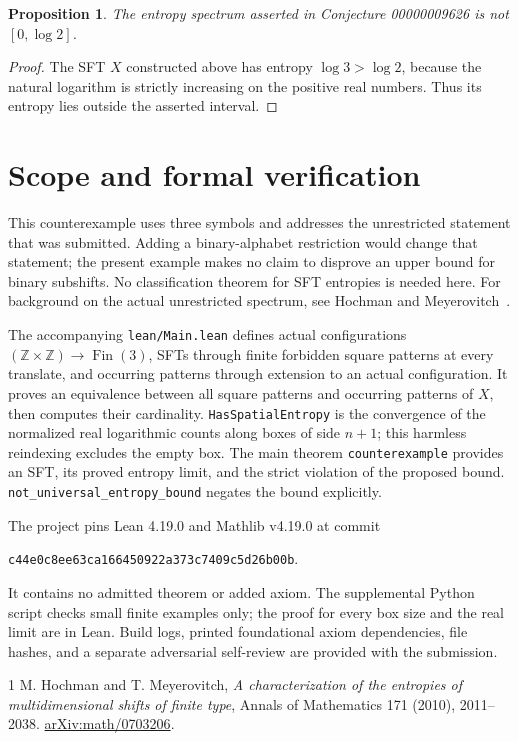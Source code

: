 \documentclass[11pt]{article}
\newtheorem{proposition}{Proposition}
\begin{document}
\begin{proposition}
The entropy spectrum asserted in Conjecture 00000009626 is not $[0,\log 2]$.
\end{proposition}
\begin{proof}
The SFT $X$ constructed above has entropy $\log 3>\log 2$, because the
natural logarithm is strictly increasing on the positive real numbers.
Thus its entropy lies outside the asserted interval.
\end{proof}

\section*{Scope and formal verification}
This counterexample uses three symbols and addresses the unrestricted
statement that was submitted. Adding a binary-alphabet restriction would
change that statement; the present example makes no claim to disprove an
upper bound for binary subshifts. No classification theorem for SFT
entropies is needed here. For background on the actual unrestricted
spectrum, see Hochman and Meyerovitch~\cite{HM}.

The accompanying \texttt{lean/Main.lean} defines actual configurations
$(\mathbb Z\times\mathbb Z)\to\operatorname{Fin}(3)$, SFTs through finite
forbidden square patterns at every translate, and occurring patterns through
extension to an actual configuration. It proves an equivalence between all
square patterns and occurring patterns of $X$, then computes their cardinality.
\texttt{HasSpatialEntropy} is the convergence of the normalized real
logarithmic counts along boxes of side $n+1$; this harmless reindexing excludes
the empty box. The main theorem \texttt{counterexample} provides an SFT,
its proved entropy limit, and the strict violation of the proposed bound.
\texttt{not\_universal\_entropy\_bound} negates the bound explicitly.

The project pins Lean 4.19.0 and Mathlib v4.19.0 at commit
\begin{center}
\small\texttt{c44e0c8ee63ca166450922a373c7409c5d26b00b}.
\end{center}
It contains no admitted theorem or added axiom. The supplemental Python
script checks small finite examples only; the proof for every box size and
the real limit are in Lean. Build logs, printed foundational axiom
dependencies, file hashes, and a separate adversarial self-review are
provided with the submission.

\begin{thebibliography}{1}
M. Hochman and T. Meyerovitch,
\emph{A characterization of the entropies of multidimensional shifts of
finite type}, Annals of Mathematics 171 (2010), 2011--2038.
\href{https://arxiv.org/abs/math/0703206}{arXiv:math/0703206}.
\end{thebibliography}
\end{document}
